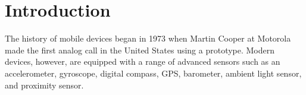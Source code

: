 \section{Introduction}

The history of mobile devices began in 1973 when Martin Cooper at Motorola made the first analog call in the United States using a prototype.
Modern devices, however, are equipped with a range of advanced sensors such as an accelerometer, gyroscope, digital compass, GPS, barometer, ambient light sensor, and proximity sensor.